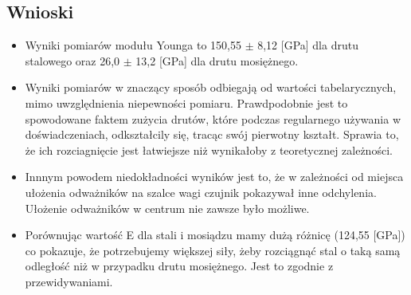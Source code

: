 \documentclass[]{article}
\begin{document}
\subsection{Wnioski}
\begin{itemize}
		\item Wyniki pomiarów modułu Younga to 150,55 \(\pm\) 8,12 [GPa] dla drutu stalowego oraz 26,0 \(\pm\) 13,2 [GPa] dla drutu mosiężnego.
		\item  Wyniki pomiarów w znaczący sposób odbiegają od wartości tabelarycznych, mimo uwzględnienia niepewności pomiaru. Prawdpodobnie jest to spowodowane faktem zużycia drutów, które podczas regularnego używania w doświadczeniach, odkształcily się, tracąc swój pierwotny kształt. Sprawia to, że ich rozciagnięcie jest łatwiejsze niż wynikałoby z teoretycznej zależności.
		\item Innnym powodem niedokładności wyników jest to, że w zależności od miejsca ułożenia odważników na szalce wagi czujnik pokazywał inne odchylenia. Ułożenie odważników w centrum nie zawsze było możliwe. 
		\item Porównując wartość E dla stali i mosiądzu mamy dużą różnicę (124,55 [GPa]) co pokazuje, że potrzebujemy większej siły, żeby rozciągnąć stal o taką samą odległość niż w przypadku drutu mosiężnego. Jest to zgodnie z przewidywaniami.
	\end{itemize}
\end{document}

